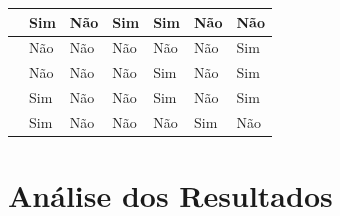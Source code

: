 \documentclass[
	12pt,				%
	openright,			%
	oneside,			%
	a4paper,			%
	english,			%
	french,				%
	spanish,			%
	brazil,				%
	]{abntex2}
\begin{document}
\begin{table}[h!]
\begin{tabular}{M|L|L|L|L|L|L}
\cite{Sang2013}			& Sim                                               & Não                                                                          & Sim                                                 & Sim                                                             & Não                                                       & Não                                                                  \\ \hline
\cite{Dolan-Gavitt2011a}	& Não                                               & Não                                                                          & Não                                                 & Não                                                             & Não                                                       & Sim                                                                  \\ \hline
\cite{Aljaedi2011}		& Não                                               & Não                                                                          & Não                                                 & Sim                                                             & Não                                                       & Sim                                                                  \\ \hline
\cite{Dezfouli2012}		& Sim                                               & Não                                                                          & Não                                                 & Sim                                                             & Não                                                       & Sim                                                                  \\ \hline
\cite{VanBaar2014}		& Sim                                               & Não                                                                          & Não                                                 & Não                                                             & Sim                                                       & Não                                                                  \\
\end{tabular}
\end{table}

\chapter{Análise dos Resultados}
\end{document}
